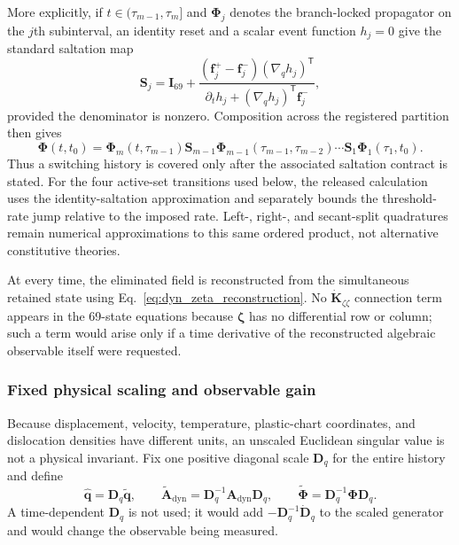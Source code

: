 More explicitly, if $t\in(\tau_{m-1},\tau_m]$ and
$\boldsymbol\Phi_j$ denotes the branch-locked propagator on the $j$th
subinterval, an identity reset and a scalar event function $h_j=0$ give the
standard saltation map \citep{KongEtAl2024}
\begin{equation}
 \boldsymbol S_j
 =\boldsymbol I_{69}
 +\frac{(\boldsymbol f_j^+-\boldsymbol f_j^-)
   (\nabla_{\!q}h_j)^{\mathsf T}}
  {\partial_t h_j+(\nabla_{\!q}h_j)^{\mathsf T}\boldsymbol f_j^-},
 \label{eq:dyn_saltation_matrix}
\end{equation}
provided the denominator is nonzero.  Composition across the registered
partition then gives
\begin{equation}
 \boldsymbol\Phi(t,t_0)
 =\boldsymbol\Phi_m(t,\tau_{m-1})\boldsymbol S_{m-1}
  \boldsymbol\Phi_{m-1}(\tau_{m-1},\tau_{m-2})\cdots
  \boldsymbol S_1\boldsymbol\Phi_1(\tau_1,t_0).
 \label{eq:dyn_piecewise_branch_product}
\end{equation}
Thus a switching history is covered only after the associated saltation
contract is stated.  For the four active-set transitions used below, the
released calculation uses the identity-saltation approximation and separately
bounds the threshold-rate jump relative to the imposed rate.  Left-, right-, and
secant-split quadratures remain numerical approximations to this same ordered
product, not alternative constitutive theories.

At every time, the eliminated field is reconstructed from the simultaneous
retained state using Eq.~\eqref{eq:dyn_zeta_reconstruction}.  No
$\dot{\boldsymbol K}_{\zeta\zeta}$ connection term appears in the 69-state
equations because $\boldsymbol\zeta$ has no differential row or column; such a
term would arise only if a time derivative of the reconstructed algebraic
observable itself were requested.

\subsubsection{Fixed physical scaling and observable gain}

Because displacement, velocity, temperature, plastic-chart coordinates, and
dislocation densities have different units, an unscaled Euclidean singular
value is not a physical invariant.  Fix one positive diagonal scale
$\boldsymbol D_q$ for the entire history and define
\begin{equation}
 \widehat{\boldsymbol q}=\boldsymbol D_q\widetilde{\boldsymbol q},
 \qquad
 \widetilde{\boldsymbol A}_{\mathrm{dyn}}
 =\boldsymbol D_q^{-1}\boldsymbol A_{\mathrm{dyn}}\boldsymbol D_q,
 \qquad
 \widetilde{\boldsymbol\Phi}
 =\boldsymbol D_q^{-1}\boldsymbol\Phi\boldsymbol D_q.
 \label{eq:dyn_scaled_generator}
\end{equation}
A time-dependent $\boldsymbol D_q$ is not used; it would add
$-\boldsymbol D_q^{-1}\dot{\boldsymbol D}_q$ to the scaled generator and
would change the observable being measured.

